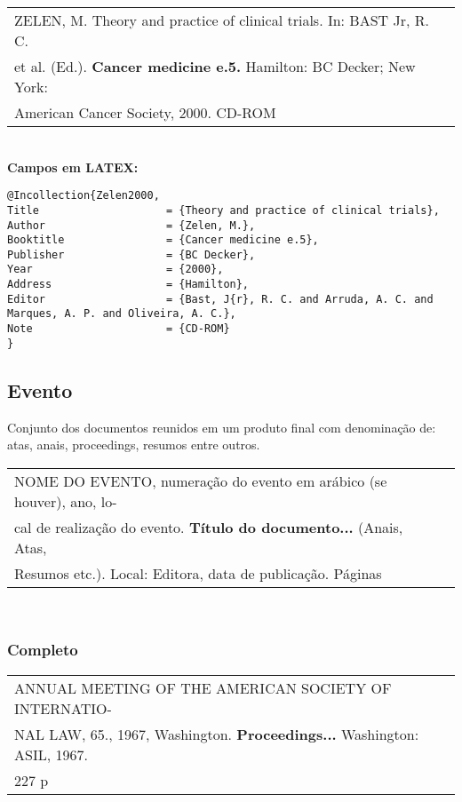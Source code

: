 \begin{tabular}{|l|c|} \hline
	ZELEN, M. Theory and practice of clinical trials. In: BAST Jr, R. C. \\et al. (Ed.). \textbf{Cancer medicine e.5.} Hamilton: BC Decker; New York: \\American Cancer Society, 2000. CD-ROM  \\\hline
\end{tabular} \\ 
		   		
\textbf{Campos em LATEX:} 
		   		
		   		
\begingroup
\fontsize{10pt}{12pt}\selectfont
\begin{verbatim}
@Incollection{Zelen2000,
Title                    = {Theory and practice of clinical trials},
Author                   = {Zelen, M.},
Booktitle                = {Cancer medicine e.5},
Publisher                = {BC Decker},
Year                     = {2000},
Address                  = {Hamilton},
Editor                   = {Bast, J{r}, R. C. and Arruda, A. C. and 
Marques, A. P. and Oliveira, A. C.},
Note                     = {CD-ROM}
}
\end{verbatim}
\endgroup
		   		
\subsection{Evento}
	
Conjunto dos documentos reunidos em um produto final com denominação
de: atas, anais, proceedings, resumos entre outros. \\
	
\begin{tabular}{|l|c|} \hline
	NOME DO EVENTO, numeração do evento em arábico (se 
	houver), ano, lo-                                     \\cal de realização do evento. \textbf{Título do documento...} (Anais, Atas, \\Resumos etc.). Local: Editora, data de publicação. Páginas \\\hline
\end{tabular} \\ 
	
\subsubsection{Completo} 
		 
\begin{tabular}{|l|c|} \hline
	ANNUAL MEETING OF THE AMERICAN SOCIETY OF INTERNATIO- \\NAL LAW, 65., 1967,  Washington. \textbf{Proceedings...} Washington: ASIL, 1967. \\227 p \\\hline
\end{tabular} \\
	
